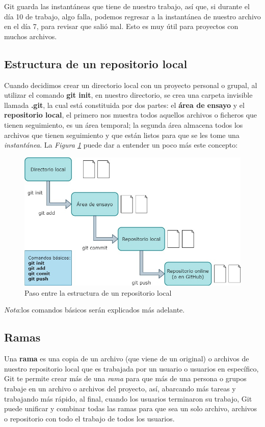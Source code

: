 Git guarda las instantáneas que tiene de nuestro trabajo, así que, si durante el día 10 de trabajo, algo falla, podemos regresar a la instantánea de nuestro archivo en el día 7, para revisar que salió mal. Esto es muy útil para proyectos con muchos archivos.


\subsection{Estructura de un repositorio local}
\hspace{0.55cm}Cuando decidimos crear un directorio local con un proyecto personal o grupal, al utilizar el comando \textbf{git init}, en nuestro directorio, se crea una carpeta invisible llamada\textbf{ .git}, la cual está constituida por dos partes: el \textbf{área de ensayo} y el \textbf{repositorio local}, el primero nos muestra todos aquellos archivos o ficheros que tienen seguimiento, es un área temporal; la segunda área almacena todos los archivos que tienen seguimiento y que están listos para que se les tome una \textit{instantánea}. La \textit{Figura \ref{fig: 2}} puede dar a entender un poco más este concepto:
\begin{figure}[H]
    \centering
    \caption{Paso entre la estructura de un repositorio local}
    \label{fig: 2}
    \includegraphics[width=\textwidth]{conceptos/g2.jpg}
\end{figure}

\textit{Nota}:los comandos básicos serán explicados más adelante.


\subsection{Ramas}
\hspace{0.55cm}Una \textbf{rama} es una copia de un archivo (que viene de un original) o archivos de nuestro repositorio local que es trabajada por un usuario o usuarios en específico, Git te permite crear más de una \textit{rama} para que más de una persona o grupos trabaje en un archivo o archivos del proyecto, así, abarcando más tareas y trabajando más rápido, al final, cuando los usuarios terminaron su trabajo, Git puede unificar y combinar todas las ramas para que sea un solo archivo, archivos o repositorio con todo el trabajo de todos los usuarios.

